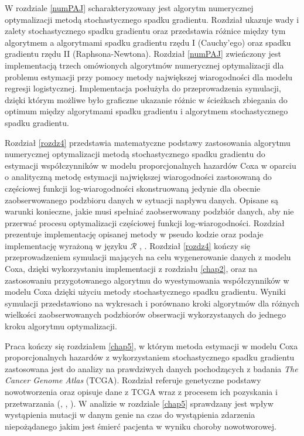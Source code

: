 W rozdziale \ref{numPAJ} scharakteryzowany jest algorytm numerycznej optymalizacji metodą stochastycznego spadku gradientu. Rozdział ukazuje wady i zalety stochastycznego spadku gradientu oraz przedstawia różnice między tym algorytmem a algorytmami spadku gradientu rzędu I (Cauchy'ego) oraz spadku gradientu rzędu II (Raphsona-Newtona). Rozdział \ref{numPAJ} zwieńczony jest implementacją trzech omówionych algorytmów numerycznej optymalizacji dla problemu estymacji przy pomocy metody największej wiarogodności dla modelu regresji logistycznej. Implementacja posłużyła do przeprowadzenia symulacji, dzięki którym możliwe było graficzne ukazanie różnic w ścieżkach zbiegania do optimum między algorytmami spadku gradientu i algorytmem stochastycznego spadku gradientu. 

Rozdział \ref{rozdz4} przedstawia matematyczne podstawy zastosowania algorytmu numerycznej optymalizacji metodą stochastycznego spadku gradientu do estymacji współczynników w modelu proporcjonalnych hazardów Coxa w oparciu o analityczną metodę estymacji największej wiarogodności zastosowaną do częściowej funkcji log-wiarogodności skonstruowaną jedynie dla obecnie zaobserwowanego podzbioru danych w sytuacji napływu danych. Opisane są warunki konieczne, jakie musi spełniać zaobserwowany podzbiór danych, aby nie przerwać procesu optymalizacji częściowej funkcji log-wiarogodności. Rozdział prezentuje implementację opisanej metody w pseudo kodzie oraz podaje implementację wyrażoną w języku $\mathcal{R}$ \cite{programikr}, \cite{biecek1}. Rozdział \ref{rozdz4} kończy się przeprowadzeniem symulacji mających na celu wygenerowanie danych z modelu Coxa, dzięki wykorzystaniu implementacji z rozdziału \ref{chap2}, oraz na zastosowaniu przygotowanego algorytmu do wyestymowania współczynników w modelu Coxa dzięki użyciu metody stochastycznego spadku gradientu. Wyniki symulacji przedstawiono na wykresach i porównano kroki algorytmów dla różnych wielkości zaobserwowanych podzbiorów obserwacji wykorzystanych do jednego kroku algorytmu optymalizacji. 

Praca kończy się rozdziałem \ref{chap5}, w którym metoda estymacji w modelu Coxa proporcjonalnych hazardów z wykorzystaniem stochastycznego spadku gradientu zastosowana jest do analizy na prawdziwych danych pochodzących z badania \textit{The Cancer Genome Atlas} (TCGA). Rozdział referuje genetyczne podstawy nowotworzenia oraz opisuje dane z TCGA wraz z procesem ich pozyskania i przetwarzania (\cite{kosa1}, \cite{kosa2}, \cite{kosa3}). W analizie w rozdziale \ref{chap5} sprawdzany jest wpływ wystąpienia mutacji w danym genie na czas do wystąpienia zdarzenia niepożądanego jakim jest śmierć pacjenta w wyniku choroby nowotworowej.

